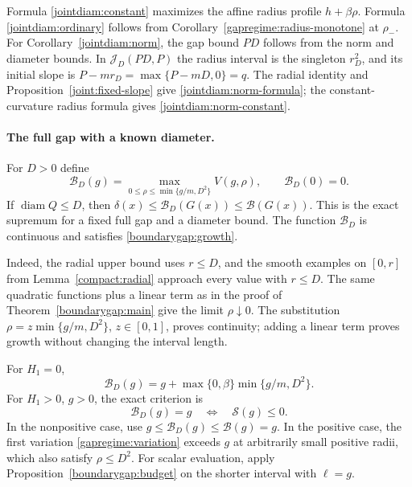 Formula \eqref{jointdiam:constant} maximizes the affine radius
profile $h+\beta\rho$. Formula \eqref{jointdiam:ordinary} follows
from Corollary~\ref{gapregime:radius-monotone} at $\rho_-$.
For Corollary~\ref{jointdiam:norm}, the gap bound $PD$ follows
from the norm and diameter bounds. In
$\mathcal J_D(PD,P)$ the radius interval is the singleton
$r_D^2$, and its initial slope is
$P-mr_D=\max\{P-mD,0\}=q$. The radial identity and
Proposition~\ref{joint:fixed-slope} give
\eqref{jointdiam:norm-formula}; the constant-curvature radius
formula gives \eqref{jointdiam:norm-constant}.

\paragraph{The full gap with a known diameter.}
For $D>0$ define
\begin{equation}\label{compact:gap-diameter}
 \mathcal B_D(g)=
 \max_{0\le\rho\le\min\{g/m,D^2\}}V(g,\rho),\qquad
 \mathcal B_D(0)=0.
\end{equation}
If $\operatorname{diam}Q\le D$, then
$\delta(x)\le\mathcal B_D(G(x))\le\mathcal B(G(x))$.
This is the exact supremum for a fixed full gap and a diameter
bound. The function $\mathcal B_D$ is continuous and satisfies
\eqref{boundarygap:growth}.

Indeed, the radial upper bound uses $r\le D$, and the smooth
examples on $[0,r]$ from Lemma~\ref{compact:radial} approach
every value with $r\le D$. The same quadratic functions plus
a linear term as in the proof of Theorem~\ref{boundarygap:main}
give the limit $\rho\downarrow0$.
The substitution $\rho=z\min\{g/m,D^2\}$, $z\in[0,1]$, proves
continuity; adding a linear term proves growth without changing
the interval length.

For $H_1=0$,
\[
 \mathcal B_D(g)=g+\max\{0,\beta\}\min\{g/m,D^2\}.
\]
For $H_1>0$, $g>0$, the exact criterion is
\[
 \mathcal B_D(g)=g\quad\Longleftrightarrow\quad\mathcal S(g)\le0.
\]
In the nonpositive case, use
$g\le\mathcal B_D(g)\le\mathcal B(g)=g$.
In the positive case, the first variation
\eqref{gapregime:variation} exceeds $g$ at arbitrarily small
positive radii, which also satisfy $\rho\le D^2$.
For scalar evaluation, apply Proposition~\ref{boundarygap:budget}
on the shorter interval with $\ell=g$.

